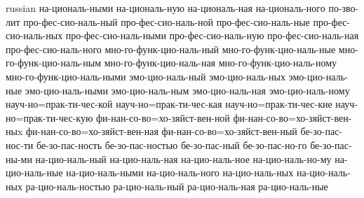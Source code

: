 \begin{hyphenrules}{russian}
{        на-циональ-ными
        на-циональ-ную
        на-циональ-ная
        на-циональ-ного
        по-зво-лит
        про-фес-сио-наль-ный
        про-фес-сио-наль-ной
        про-фес-сио-наль-ные
        про-фес-сио-наль-ных
        про-фес-сио-наль-ными
        про-фес-сио-наль-ную
        про-фес-сио-наль-ная
        про-фес-сио-наль-ного
        мно-го-функ-цио-наль-ный
        мно-го-функ-цио-наль-ные
        мно-го-функ-цио-наль-ным
        мно-го-функ-цио-наль-ная
        мно-го-функ-цио-наль-ному
        мно-го-функ-цио-наль-ными
        эмо-цио-наль-ный
        эмо-цио-наль-ных
        эмо-цио-наль-ные
        эмо-цио-наль-ными
        эмо-цио-наль-ным
        эмо-цио-наль-ная
        эмо-цио-наль-ному
        науч-но=прак-ти-чес-кой
        науч-но=прак-ти-чес-кая
        науч-но=прак-ти-чес-кие
        науч-но=прак-ти-чес-кую
        фи-нан-со-во=хо-зяйст-вен-ной
        фи-нан-со-во=хо-зяйст-вен-ныx
        фи-нан-со-во=хо-зяйст-вен-ная
        фи-нан-со-во=хо-зяйст-вен-ный
        бе-зо-пас-нос-ти
        бе-зо-пас-ность
        бе-зо-пас-ностью
        бе-зо-пас-ный
        бе-зо-пас-но-го
        бе-зо-пас-ны-ми
        на-цио-наль-ный
        на-цио-наль-ная
        на-цио-наль-ное
        на-цио-наль-но-му
        на-цио-наль-ные
        на-цио-наль-ными
        на-цио-наль-ного
        на-цио-наль-ных
        на-цио-наль-ных
        ра-цио-наль-ностью
        ра-цио-наль-ный
        ра-цио-наль-ная
        ра-цио-наль-ные
    }
\end{hyphenrules}